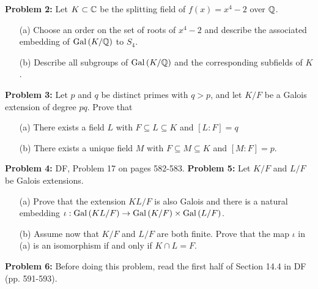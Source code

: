 \documentclass[12pt]{article}
\begin{document}
{\bf Problem 2:} Let $K\subset{\mathbb C}$ be the splitting field of $f(x)=x^4-2$ over ${\mathbb Q}$.

\begin{itemize}
\item[(a)] Choose an order on the set of roots of $x^4-2$ and describe the associated embedding
of ${\rm Gal\,}(K/{\mathbb Q})$ to $S_4$.

\item[(b)] Describe all subgroups of ${\rm Gal\,}(K/{\mathbb Q})$ and the corresponding subfields of $K$.

\end{itemize}

\skv
{\bf Problem 3:} Let $p$ and $q$ be distinct primes with $q>p$,
and let $K/F$ be a Galois extension of degree $pq$. Prove that
\begin{itemize}
\item[(a)] There exists a field $L$ with $F\subseteq L\subseteq K$ and $[L:F]=q$

\item[(b)] There exists a unique field $M$ with $F\subseteq M\subseteq K$ and $[M:F]=p$.
\end{itemize}
\skv

{\bf Problem 4:} DF, Problem 17 on pages 582-583. 
\skv
{\bf Problem 5:} Let $K/F$ and $L/F$ be Galois extensions.

\begin{itemize}
\item[(a)] Prove that the extension $KL/F$ is also Galois and there is a natural
embedding $\iota:{\rm Gal\,}(KL/F)\to {\rm Gal\,}(K/F)\times {\rm Gal\,}(L/F)$.

\item[(b)]
Assume now that $K/F$ and $L/F$ are both finite. Prove that the map $\iota$ in (a)
is an isomorphism if and only if $K\cap L=F$.
\end{itemize}

{\bf Problem 6:} \rm Before doing this problem, read the first half
of Section 14.4 in DF (pp. 591-593).
\end{document}
